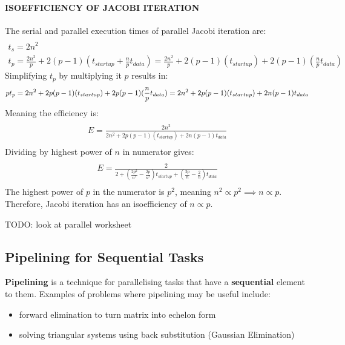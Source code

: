 \documentclass{article}
\begin{document}
\paragraph{\textbf{ISOEFFICIENCY OF JACOBI ITERATION}} The serial and parallel execution times of parallel Jacobi iteration are:
\begin{multline}\\
	t_s = 2n^2 \\
	t_p = \frac{2n^2}{p} + 2(p - 1)(t_{startup} + \frac{n}{p}t_{data}) = \frac{2n^2}{p} + 2(p - 1)(t_{startup}) + 2(p - 1)(\frac{n}{p}t_{data})
\end{multline}
Simplifying $t_p$ by multiplying it $p$ results in:
\begin{equation}
	pt_p = 2n^2 + 2p(p - 1)(t_{startup}) + 2p(p - 1)(\frac{n}{p}t_{data}) \\
	=  2n^2 + 2p(p - 1)(t_{startup}) + 2n(p - 1)t_{data}
\end{equation}
Meaning the efficiency is:
\begin{multline} \\
E = \frac{2n^2}{2n^2 + 2p(p - 1)(t_{startup}) + 2n(p - 1)t_{data}} \\
\end{multline}
Dividing by highest power of $n$ in numerator gives:
\begin{multline} \\
	E = \frac{2}{2 + (\frac{2p^2}{n^2} - \frac{2p}{n^2})t_{startup} + (\frac{2p}{n} - \frac{2}{n})t_{data}} \\
\end{multline}
The highest power of $p$ in the numerator is $p^2$, meaning $n^2 \propto p^2 \implies n \propto p$. Therefore, Jacobi iteration has an isoefficiency of $n \propto p$.

TODO: look at parallel worksheet

\subsection{Pipelining for Sequential Tasks}

\textbf{Pipelining} is a technique for parallelising tasks that have a \textbf{sequential} element to them. Examples of problems where pipelining may be useful include:
\begin{itemize}
	\item forward elimination to turn matrix into echelon form
	\item solving triangular systems using back substitution (Gaussian Elimination)
\end{itemize}
\end{document}
